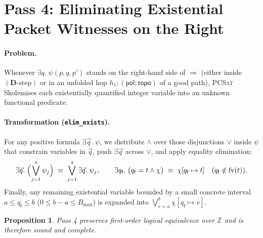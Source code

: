 \documentclass[11pt,a4paper]{article}
\newtheorem{proposition}[theorem]{Proposition}
\theoremstyle{definition}
\theoremstyle{remark}
\begin{document}
\section{Pass 4: Eliminating Existential Packet Witnesses on the Right}

\paragraph{Problem.}
Whenever $\exists q.\; \psi(p, q, p')$ stands on the right-hand side of $\Rightarrow$ (either inside
$(\mathbf{D}\text{-step})$ or in an unfolded hop $h_1 ; (\mathsf{pol} ; \mathsf{topo})$ of a good
path), \textsc{PCSat} Skolemises each existentially quantified integer variable into an unknown
functional predicate.

\paragraph{Transformation (\texttt{elim\_exists}).}
For any positive formula $\exists \vec{q}.\; \psi$, we distribute $\land$ over those disjunctions
$\lor$ inside $\psi$ that constrain variables in $\vec{q}$, push $\exists \vec{q}$ across $\lor$,
and apply equality elimination:
\[
  \exists \vec{q}.\; \Bigl(\bigvee_{j=1}^s \psi_j\Bigr) \;\equiv\; \bigvee_{j=1}^s \exists \vec{q}.\; \psi_j,
  \qquad
  \exists q_{\mathsf{f}}.\; \bigl(q_{\mathsf{f}} = t \land \chi\bigr) \;\equiv\; \chi[q_{\mathsf{f}} \mapsto t]
  \quad (q_{\mathsf{f}} \notin \mathrm{fv}(t)).
\]
Finally, any remaining existential variable bounded by a small concrete interval
$a \le q_{\mathsf{f}} \le b$ ($0 \le b - a \le B_{\max}$) is expanded into $\bigvee_{v=a}^b \chi[q_{\mathsf{f}} \mapsto v]$.

\begin{proposition}
Pass 4 preserves first-order logical equivalence over $\mathbb{Z}$ and is therefore sound and complete.
\end{proposition}
\end{document}

